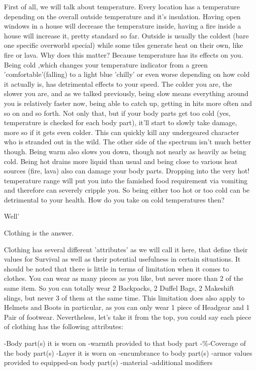 \documentclass[11pt]{report}
\begin{document}
First of all, we will talk about temperature. Every location has a temperature depending on the overall outside temperature and it's insulation. Having open windows in a house will decrease the temperature inside, having a fire inside a house will increase it, pretty standard so far. Outside is usually the coldest (bare one specific overworld special) while some tiles generate heat on their own, like fire or lava. Why does this matter? Because temperature has its effects on you. Being cold ,which changes your temperature indicator from a green 'comfortable'(falling) to a light blue 'chilly' or even worse depending on how cold it actually is, has detrimental effects to your speed. The colder you are, the slower you are, and as we talked previously, being slow means everything around you is relatively faster now, being able to catch up, getting in hits more often and so on and so forth. Not only that, but if your body parts get too cold (yes, temperature is checked for each body part), it'll start to slowly take damage, more so if it gets even colder. This can quickly kill any undergeared character who is stranded out in the wild. The other side of the spectrum isn't much better though. Being warm also slows you down, though not nearly as heavily as being cold. Being hot drains more liquid than usual and being close to various heat sources (fire, lava) also can damage your body parts. Dropping into the very hot! temperature range will put you into the famished food requirement via vomiting and therefore can severely cripple you. So being either too hot or too cold can be detrimental to your health. How do you take on cold temperatures then?

Well'

Clothing is the answer.

Clothing has several different 'attributes' as we will call it here, that define their values for Survival as well as their potential usefulness in certain situations. It should be noted that there is little in terms of limitation when it comes to clothes. You can wear as many pieces as you like, but never more than 2 of the same item. So you can totally wear 2 Backpacks, 2 Duffel Bags, 2 Makeshift slings, but never 3 of them at the same time. This limitation does also apply to Helmets and Boots in particular, as you can only wear 1 piece of Headgear and 1 Pair of footwear.
Nevertheless, let's take it from the top, you could say each piece of clothing has the following attributes:

-Body part(s) it is worn on
-warmth provided to that body part
-\%-Coverage of the body part(s)
-Layer it is worn on
-encumbrance to body part(s)
-armor values provided to equipped-on body part(s)
-material
-additional modifiers
\end{document}
